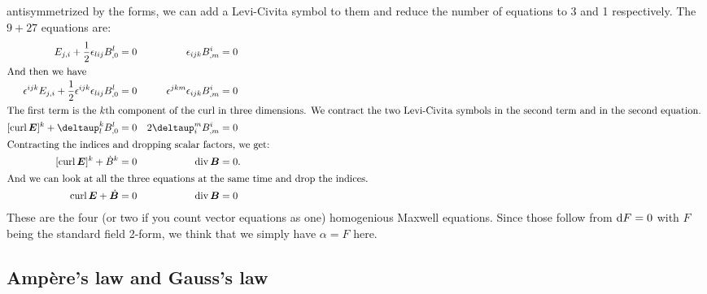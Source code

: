 \documentclass[11pt, english, fleqn, DIV=15, headinclude, BCOR=1cm]{scrartcl}
\begin{document}
antisymmetrized by the forms, we can add a Levi-Civita symbol to them and
reduce the number of equations to 3 and 1 respectively. The $9 + 27$ equations
are:
\begin{align*}
    E_{j,i} + \frac12 \epsilon_{lij} B^l_{,0} &= 0
    &
    \epsilon_{ijk} B^i_{,m} &= 0 \\
    \intertext{%
        And then we have
    }
    \epsilon^{ijk} E_{j,i} + \frac12 \epsilon^{ijk} \epsilon_{lij} B^l_{,0} &= 0
    &
    \epsilon^{jkm} \epsilon_{ijk} B^i_{,m} &= 0 \\
    \intertext{%
        The first term is the $k$th component of the curl in three dimensions.
        We contract the two Levi-Civita symbols in the second term and in the
        second equation.
    }
    [\curl \vec E]^k + \deltaup^k_l B^l_{,0} &= 0
    &
    2 \deltaup^m_i B^i_{,m} &= 0 \\
    \intertext{%
        Contracting the indices and dropping scalar factors, we get:
    }
    [\curl \vec E]^k + \dot B^k &= 0
    &
    \divergence \vec B &= 0. \\
    \intertext{%
        And we can look at all the three equations at the same time and drop
        the indices.
    }
    \curl \vec E + \dot{\vec B} &= 0
    &
    \divergence \vec B &= 0
\end{align*}
These are the four (or two if you count vector equations as one) homogenious
Maxwell equations. Since those follow from $\mathop{}\!\mathrm d F = 0$ with $F$ being the
standard field 2-form, we think that we simply have $\alpha = F$ here.

\subsection{Ampère's law and Gauss's law}
\end{document}
